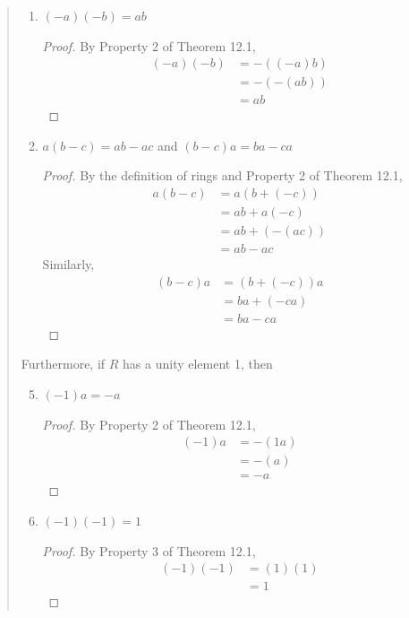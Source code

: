 \documentclass[12pt, letterpaper]{article}
\begin{document}
\begin{quote}
\begin{enumerate}
\begin{proof}
        \end{proof}
        \item $(-a)(-b) = ab$
        \begin{proof}
            By Property 2 of Theorem 12.1,
            \begin{align*}
                (-a)(-b) &= -((-a)b) \\
                &= -(-(ab)) \\
                &= ab
                \end{align*}
        \end{proof}
        \item $a(b - c) = ab - ac$ and $(b - c)a = ba - ca$
        \begin{proof}
            By the definition of rings and Property 2 of Theorem 12.1,
            \begin{align*}
                a(b - c) &= a(b + (-c)) \\
                &= ab + a(-c) \\
                &= ab + (-(ac)) \\
                &= ab - ac
            \end{align*}
            Similarly,
            \begin{align*}
                (b - c)a &= (b + (-c))a \\
                &= ba + (-ca) \\
                &= ba - ca
                \end{align*}
        \end{proof}
    \end{enumerate}
    Furthermore, if $R$ has a unity element 1, then
    \begin{enumerate}
        \setcounter{enumi}{4}
        \item $(-1)a = -a$
        \begin{proof}
            By Property 2 of Theorem 12.1,
            \begin{align*}
                (-1)a &= -(1a) \\
                &= -(a) \\
                &= -a
                \end{align*}
        \end{proof}
        \item $(-1)(-1) = 1$
        \begin{proof}
            By Property 3 of Theorem 12.1,
            \begin{align*}
                (-1)(-1) &= (1)(1) \\
                &= 1
                \end{align*}
        \end{proof}
    \end{enumerate}
\end{quote}
\end{document}
